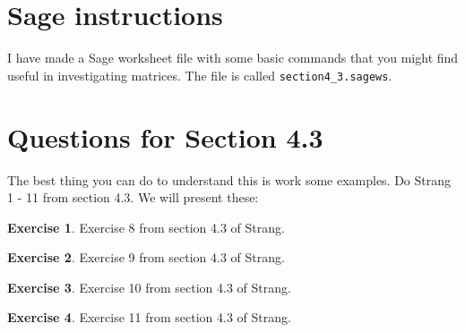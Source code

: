 \documentclass[11pt]{amsart}
\theoremstyle{definition}
\newtheorem{exercise}{Exercise}
\begin{document}
\section{Sage instructions}

I have made a Sage worksheet file with some basic commands that you might find useful in investigating matrices. The file is called \texttt{section4\_3.sagews}.


\section{Questions for Section 4.3}
\setcounter{exercise}{126}

The best thing you can do to understand this is work some examples. Do Strang 1 - 11 from section 4.3. We will present these:


\begin{exercise}
Exercise 8 from section 4.3 of Strang.
\end{exercise}

\begin{exercise}
Exercise 9 from section 4.3 of Strang.
\end{exercise}

\begin{exercise}
Exercise 10 from section 4.3 of Strang.
\end{exercise}

\begin{exercise}
Exercise 11 from section 4.3 of Strang.
\end{exercise}
\end{document}
